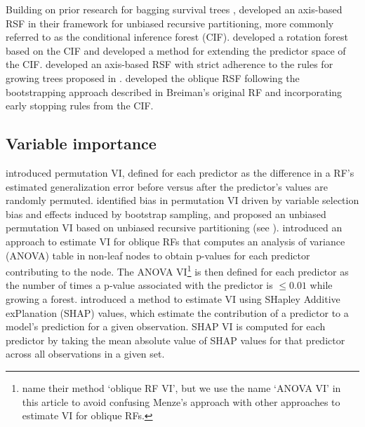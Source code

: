 \documentclass[twoside,11pt]{article}\usepackage[]{graphicx}\usepackage[]{xcolor}
\begin{document}
Building on prior research for bagging survival trees \citep{hothorn2004bagging}, \citet{hothorn2006unbiased} developed an axis-based RSF in their framework for unbiased recursive partitioning, more commonly referred to as the conditional inference forest (CIF). \citet{zhou2016random} developed a rotation forest based on the CIF and \citet{wang2017random} developed a method for extending the predictor space of the CIF. \citet{ishwaran2008random} developed an axis-based RSF with strict adherence to the rules for growing trees proposed in \citet{breiman2001random}. \citet{jaeger2019oblique} developed the oblique RSF following the bootstrapping approach described in Breiman's original RF and incorporating early stopping rules from the CIF.

\subsection{Variable importance}

\citet{breiman2001random} introduced permutation VI, defined for each predictor as the difference in a RF's estimated generalization error before versus after the predictor's values are randomly permuted. \citet{strobl2007bias} identified bias in permutation VI driven by variable selection bias and effects induced by bootstrap sampling, and proposed an unbiased permutation VI based on unbiased recursive partitioning (see \citet{hothorn2006unbiased}). \citet{menze2011oblique} introduced an approach to estimate VI for oblique RFs that computes an analysis of variance (ANOVA) table in non-leaf nodes to obtain p-values for each predictor contributing to the node. The ANOVA VI\footnote{\citet{menze2011oblique} name their method `oblique RF VI', but we use the name `ANOVA VI' in this article to avoid confusing Menze's approach with other approaches to estimate VI for oblique RFs.} is then defined for each predictor as the number of times a p-value associated with the predictor is $\leq 0.01$ while growing a forest. \citet{lundberg2017unified} introduced a method to estimate VI using SHapley Additive exPlanation (SHAP) values, which estimate the contribution of a predictor to a model's prediction for a given observation. SHAP VI is computed for each predictor by taking the mean absolute value of SHAP values for that predictor across all observations in a given set.

\end{document}
